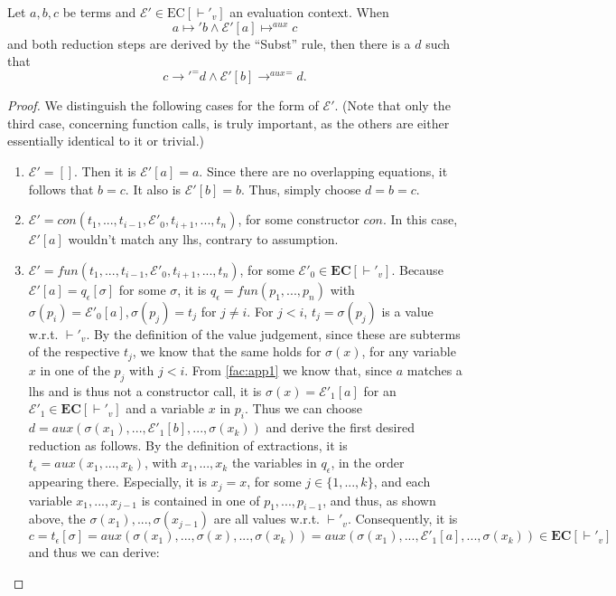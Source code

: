 \begin{lemma}
\label{lem:app2}
Let $a, b, c$ be terms and $\mathcal{E}' \in \textrm{EC}[\vdash'_v]$ an evaluation context. When
\[
a \mapsto' b \land \mathcal{E}'[a] \mapsto^{aux} c
\]
and both reduction steps are derived by the ``Subst'' rule, then there is a $d$ such that
\[
c {\longrightarrow'}^= d \land \mathcal{E}'[b] {\longrightarrow^{aux}}^= d.
\]
\begin{proof}
We distinguish the following cases for the form of $\mathcal{E}'$. (Note that only the third case, concerning function calls, is truly important, as the others are either essentially identical to it or trivial.)

\begin{enumerate}
\item $\mathcal{E}' = []$. Then it is $\mathcal{E}'[a] = a$. Since there are no overlapping equations, it follows that $b = c$. It also is $\mathcal{E}'[b] = b$. Thus, simply choose $d = b = c$.

\item $\mathcal{E}' = con(t_1, ..., t_{i-1}, \mathcal{E}'_0, t_{i+1}, ..., t_n)$, for some constructor $con$. In this case, $\mathcal{E}'[a]$ wouldn't match any lhs, contrary to assumption.

\item $\mathcal{E}' = fun(t_1, ..., t_{i-1}, \mathcal{E}'_0, t_{i+1}, ..., t_n)$, for some $\mathcal{E}'_0 \in \mathbf{EC}[\vdash'_v]$.
Because $\mathcal{E}'[a] = q_\epsilon[\sigma]$ for some $\sigma$, it is $q_\epsilon = fun(p_1, ..., p_n)$ with $\sigma(p_i) = \mathcal{E}'_0[a], \sigma(p_j) = t_j$ for $j \neq i$. For $j < i$, $t_j = \sigma(p_j)$ is a value w.r.t. $\vdash'_v$. By the definition of the value judgement, since these are subterms of the respective $t_j$, we know that the same holds for $\sigma(x)$, for any variable $x$ in one of the $p_j$ with $j < i$. From \autoref{fac:app1} we know that, since $a$ matches a lhs and is thus not a constructor call, it is $\sigma(x) = \mathcal{E}'_1[a]$ for an $\mathcal{E}'_1 \in \mathbf{EC}[\vdash'_v]$ and a variable $x$ in $p_i$. Thus we can choose $d = aux(\sigma(x_1), ..., \mathcal{E}'_1[b], ..., \sigma(x_k))$ and derive the first desired reduction as follows. By the definition of extractions, it is $t_\epsilon = aux(x_1, ..., x_k)$, with $x_1, ..., x_k$ the variables in $q_\epsilon$, in the order appearing there. Especially, it is $x_j = x$, for some $j \in \{1, ..., k\}$, and each variable $x_1, ..., x_{j-1}$ is contained in one of $p_1, ..., p_{i-1}$, and thus, as shown above, the $\sigma(x_1), ..., \sigma(x_{j-1})$ are all values w.r.t. $\vdash'_v$. Consequently, it is $c = t_\epsilon[\sigma] = aux(\sigma(x_1), ..., \sigma(x), ..., \sigma(x_k)) = aux(\sigma(x_1), ..., \mathcal{E}'_1[a], ..., \sigma(x_k)) \in \mathbf{EC}[\vdash'_v]$ and thus we can derive:


\end{enumerate}
\end{proof}
\end{lemma}
